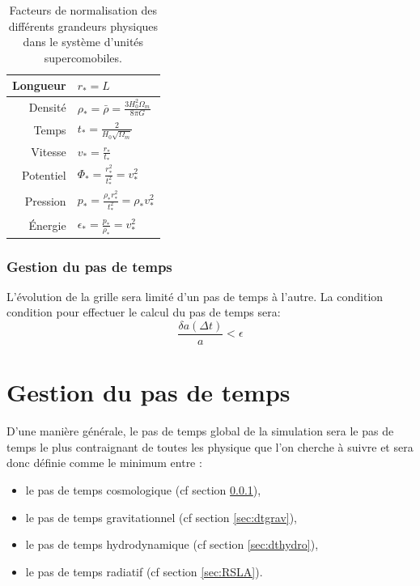 \begin{table}
\begin{center}
\begin{tabular}{r l} \hline 
Longueur  & $r_*=L$\\ \hline 
Densité & $\rho_* = \bar{\rho} = \frac{3H_0^2 \Omega_m}{8\pi G}$\\ \hline 
Temps & $t_* = \frac{2}{H_0 \sqrt{\Omega_m}}$\\ \hline 
Vitesse & $v_* = \frac{r_*}{t_*}$\\ \hline 
Potentiel & $\Phi_* = \frac{r_*^2}{t_*^2} = v_*^2$\\ \hline 
Pression & $p_* = \frac{\rho_* r_*^2}{t_*^2} = \rho_* v_*^2$\\ \hline 
Énergie & $\epsilon_* = \frac{p_*}{\rho_*} = v_*^2$\\ \hline 
\end{tabular} 
\end{center}
\caption[Facteurs de normalisation]{Facteurs de normalisation des différents grandeurs physiques dans le système d'unités supercomobiles.
\label{tab:comobilfact}}
\end{table}

\subsubsection{Gestion du pas de temps}
\label{sec:dtcosmo}
L'évolution de la grille sera limité d'un pas de temps à l'autre.
La condition condition pour effectuer le calcul du pas de temps sera:
\begin{equation}
\frac{\delta a (\Delta t) } {a} < \epsilon
\end{equation}


\section{Gestion du pas de temps}

D'une manière générale, le pas de temps global de la simulation sera le pas de temps le plus contraignant de toutes les physique que l'on cherche à suivre et sera donc définie comme le minimum entre :

\begin{itemize}
\item le pas de temps cosmologique (cf section \ref{sec:dtcosmo}),
\item le pas de temps gravitationnel (cf section \ref{sec:dtgrav}),
\item le pas de temps hydrodynamique (cf section \ref{sec:dthydro}),
\item le pas de temps radiatif (cf section \ref{sec:RSLA}).
\end{itemize}


